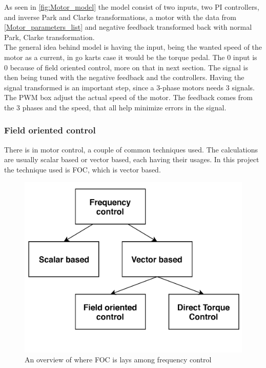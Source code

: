 As seen in \ref{fig:Motor_model} the model consist of two inputs, two PI controllers, and inverse Park and Clarke transformations, a motor with the data from \ref{Motor_parameters_list} and negative feedback transformed back with normal Park, Clarke transformation.\\

The general idea behind model is having the input, being the wanted speed of the motor as a current, in go karts case it would be the torque pedal. The $0$ input is $0$ because of field oriented control, more on that in next section. The signal is then being tuned with the negative feedback and the controllers. Having the signal transformed is an important step, since a 3-phase motors needs 3 signals. The PWM box adjust the actual speed of the motor. The feedback comes from the 3 phases and the speed, that all help minimize errors in the signal. \\

\subsubsection{Field oriented control}
There is in motor control, a couple of common techniques used. The calculations are usually scalar based or vector based, each having their usages. In this project the technique used is FOC, which is vector based. \\

\begin{figure} [H]
    \centering
    \includegraphics[scale=0.6]{pictures/control/udklip1.PNG}
    \caption{An overview of where FOC is lays among frequency control}
    \label{fig:my_label}
\end{figure} 

